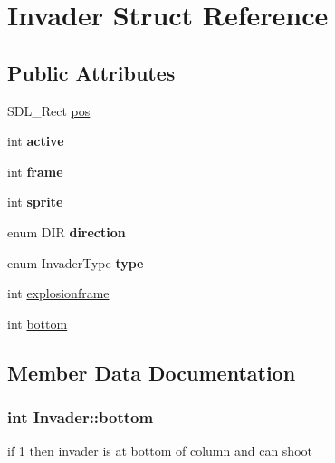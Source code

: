 \hypertarget{structInvader}{}\section{Invader Struct Reference}
\label{structInvader}
\subsection*{Public Attributes}
\begin{DoxyCompactItemize}
\item 
S\+D\+L\+\_\+\+Rect \hyperlink{structInvader_aa2028665eb1a567b754596ea72e76855}{pos}
\item 
\hypertarget{structInvader_a580b5e71be118589c12e819ecf26960b}{}int {\bfseries active}\label{structInvader_a580b5e71be118589c12e819ecf26960b}

\item 
\hypertarget{structInvader_a7b64aebf3ef230739d88d9d9ab4a97b8}{}int {\bfseries frame}\label{structInvader_a7b64aebf3ef230739d88d9d9ab4a97b8}

\item 
\hypertarget{structInvader_aac6c3cdde54b3cbe109fd5c7e2e5ae90}{}int {\bfseries sprite}\label{structInvader_aac6c3cdde54b3cbe109fd5c7e2e5ae90}

\item 
\hypertarget{structInvader_a9c793a2a19e4e8ff468a8d80a2c5beff}{}enum D\+I\+R {\bfseries direction}\label{structInvader_a9c793a2a19e4e8ff468a8d80a2c5beff}

\item 
\hypertarget{structInvader_a437fdaa14fea0e892e79ab6fe94fd120}{}enum Invader\+Type {\bfseries type}\label{structInvader_a437fdaa14fea0e892e79ab6fe94fd120}

\item 
int \hyperlink{structInvader_aa09d48ba0bdf587a6532711c226594c7}{explosionframe}
\item 
int \hyperlink{structInvader_ae58a7596b4a32ba1f3a23941b1fc6995}{bottom}
\end{DoxyCompactItemize}


\subsection{Member Data Documentation}
\hypertarget{structInvader_ae58a7596b4a32ba1f3a23941b1fc6995}{}
\subsubsection[{bottom}]{\setlength{\rightskip}{0pt plus 5cm}int Invader\+::bottom}\label{structInvader_ae58a7596b4a32ba1f3a23941b1fc6995}
if 1 then invader is at bottom of column and can shoot \hypertarget{structInvader_aa09d48ba0bdf587a6532711c226594c7}{}
